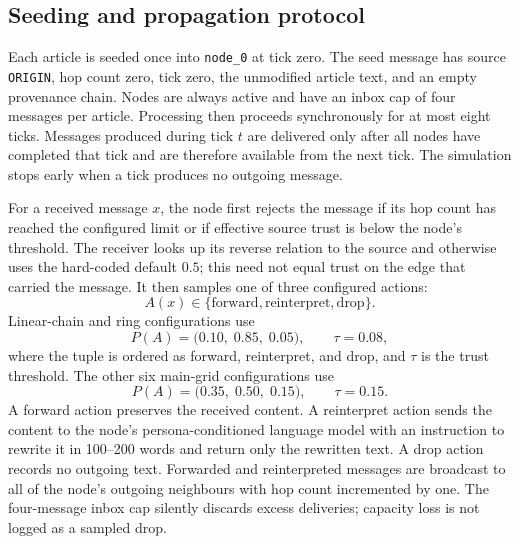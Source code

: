 \subsection{Seeding and propagation protocol}
\label{subsec:simulation-propagation}

Each article is seeded once into \texttt{node\_0} at tick zero. The seed message has
source \texttt{ORIGIN}, hop count zero, tick zero, the unmodified article text,
and an empty provenance chain.  Nodes are always active and have an inbox cap
of four messages per article.  Processing then proceeds synchronously for at
most eight ticks.  Messages produced during tick \(t\) are delivered only
after all nodes have completed that tick and are therefore available from the
next tick.  The simulation stops early when a tick produces no outgoing
message.

For a received message \(x\), the node first rejects the message if its hop
count has reached the configured limit or if effective source trust is below
the node's threshold. The receiver looks up its reverse relation to the source
and otherwise uses the hard-coded default \(0.5\); this need not equal trust
on the edge that carried the message. It then samples one of three configured actions:
\[
  A(x)\in\{\text{forward},\text{reinterpret},\text{drop}\}.
\]
Linear-chain and ring configurations use
\begin{equation}
  P(A)=\bigl(0.10,\;0.85,\;0.05\bigr),
  \qquad \tau=0.08,
  \label{eq:chain-actions}
\end{equation}
where the tuple is ordered as forward, reinterpret, and drop, and \(\tau\) is
the trust threshold. The other six main-grid configurations use
\begin{equation}
  P(A)=\bigl(0.35,\;0.50,\;0.15\bigr),
  \qquad \tau=0.15.
  \label{eq:graph-actions}
\end{equation}
A forward action preserves the received content.  A reinterpret action sends
the content to the node's persona-conditioned language model with an
instruction to rewrite it in 100--200 words and return only the rewritten
text.  A drop action records no outgoing text.  Forwarded and reinterpreted
messages are broadcast to all of the node's outgoing neighbours with hop count
incremented by one.
The four-message inbox cap silently discards excess deliveries; capacity loss
is not logged as a sampled drop.

